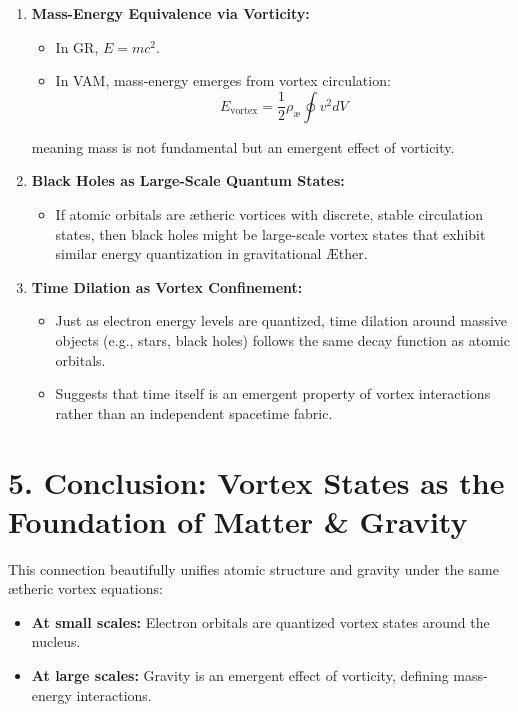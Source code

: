 \documentclass[a4paper,10pt]{article}
\begin{document}
\begin{enumerate}
    \item \textbf{Mass-Energy Equivalence via Vorticity:}
    \begin{itemize}
        \item In GR, \(E = mc^2\).
    \item In VAM, mass-energy emerges from vortex circulation:
        \[
        E_\text{vortex} = \frac{1}{2} \rho_\text{\ae} \oint v^2 dV
        \]
    \end{itemize}
    meaning mass is not fundamental but an emergent effect of vorticity.
    \item \textbf{Black Holes as Large-Scale Quantum States:}
    \begin{itemize}
    \item If atomic orbitals are ætheric vortices with discrete, stable circulation states, then black holes might be large-scale vortex states that exhibit similar energy quantization in gravitational Æther.
    \end{itemize}
    \item \textbf{Time Dilation as Vortex Confinement:}
    \begin{itemize}
    \item Just as electron energy levels are quantized, time dilation around massive objects (e.g., stars, black holes) follows the same decay function as atomic orbitals.
    \item Suggests that time itself is an emergent property of vortex interactions rather than an independent spacetime fabric.
    \end{itemize}
\end{enumerate}

\section*{5. Conclusion: Vortex States as the Foundation of Matter \& Gravity}

This connection beautifully unifies atomic structure and gravity under the same ætheric vortex equations:

\begin{itemize}
    \item \textbf{At small scales:} Electron orbitals are quantized vortex states around the nucleus.
    \item \textbf{At large scales:} Gravity is an emergent effect of vorticity, defining mass-energy interactions.
\end{itemize}
\end{document}
